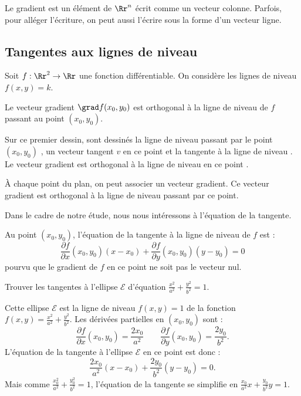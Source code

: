 \documentclass[11pt,class=report,crop=false]{standalone}
\begin{document}
\begin{remarque*}
Le gradient est un élément de $\Rr^n$ écrit comme un vecteur colonne. Parfois, pour alléger l'écriture, on peut aussi l'écrire sous la forme d'un vecteur ligne.
\end{remarque*}

\subsection{Tangentes aux lignes de niveau}


Soit $f : \Rr^2 \to \Rr$ une fonction différentiable. On considère les lignes de niveau $f(x,y)=k$.


\begin{proposition}
Le vecteur gradient $\grad f(x_0,y_0)$ est orthogonal à la ligne de niveau de $f$ passant au point $(x_0,y_0)$. 
\end{proposition}


Sur ce premier dessin, sont dessinés la ligne de niveau passant par le point $(x_0,y_0)$ , un vecteur tangent $v$ en ce point et la tangente à la ligne de niveau . 
Le vecteur gradient est orthogonal à la ligne de niveau en ce point .


\bigskip


À chaque point du plan, on peut associer un vecteur gradient. Ce vecteur gradient est orthogonal à la ligne de niveau passant par ce point.


Dans le cadre de notre étude, nous nous intéressons à l'équation de la tangente.
\begin{proposition}
Au point $(x_0,y_0)$, l'équation de la tangente à la ligne de niveau de $f$ est :
$$\frac{\partial f}{\partial x}(x_0,y_0)(x-x_0)+\frac{\partial f}{\partial y}(x_0,y_0)(y-y_0)=0$$
pourvu que le gradient de $f$ en ce point ne soit pas le vecteur nul.
\end{proposition}



\begin{exemple}
Trouver les tangentes à l'ellipse $\mathcal{E}$ d'équation $\frac{x^2}{a^2}+\frac{y^2}{b^2} = 1$.


Cette ellipse $\mathcal{E}$ est la ligne de niveau $f(x,y)=1$ de la fonction
$f(x,y) = \frac{x^2}{a^2}+\frac{y^2}{b^2}$. 
Les dérivées partielles en $(x_0, y_0)$ sont :
$$\frac{\partial f}{\partial x}(x_0,y_0) = \frac{2x_0}{a^2} \qquad \frac{\partial f}{\partial y}(x_0,y_0) = \frac{2y_0}{b^2}.$$
L'équation de la tangente à l'ellipse $\mathcal{E}$ en ce point est donc :
$$\frac{2x_0}{a^2}(x-x_0)+\frac{2y_0}{b^2}(y-y_0)=0.$$
Mais comme $\frac{x_0^2}{a^2}+\frac{y_0^2}{b^2} = 1$, l'équation de la tangente se simplifie en $\displaystyle \frac{x_0}{a^2}x + \frac{y_0}{b^2} y = 1$.
\end{exemple}
\end{document}

